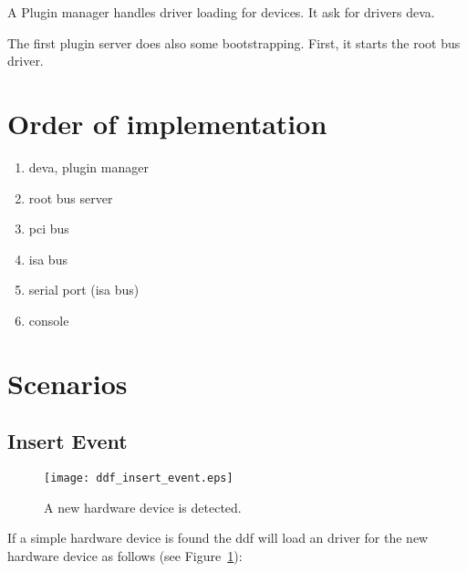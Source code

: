 A Plugin manager handles driver loading for devices.  It ask for drivers
deva.  

The first plugin server does also some bootstrapping.  First, it starts
the root bus driver.

\section{Order of implementation}

\begin{enumerate}
\item deva, plugin manager
\item root bus server
\item pci bus
\item isa bus
\item serial port  (isa bus)
\item console 
\end{enumerate}

\section{Scenarios}
\subsection{Insert Event}

\begin{figure}
  \begin{center}
    \texttt{[image: ddf\_insert\_event.eps]}
  \end{center}
  \caption{A new hardware device is detected.}
  \label{fig:ddf_insert_event}
\end{figure}

If a simple hardware device is found the ddf will load an driver for
the new hardware device as follows (see Figure~\ref{fig:ddf_insert_event}):

